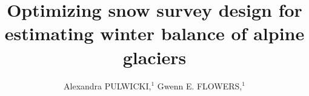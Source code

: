 \documentclass[twocolumn,letterpaper]{igs}
\begin{document}
\title[Optimizing snow survey design for winter balance]{Optimizing snow survey design for estimating winter balance of alpine glaciers}

\author[Pulwicki and Flowers]{Alexandra PULWICKI,$^1$
  Gwenn E. FLOWERS,$^1$}







\end{document}
